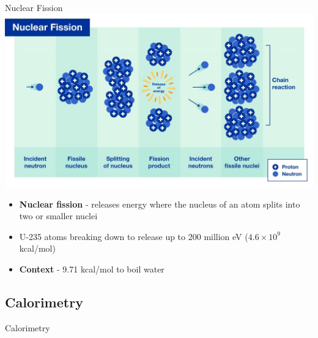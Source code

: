 \documentclass[11pt]{beamer}
\begin{document}
\begin{frame}{Nuclear Fission}
  \centering
  \includegraphics[width=0.8\linewidth]{nuclear_fission}

  \begin{itemize}
  \item \textbf{Nuclear fission} - releases energy where the
    nucleus of an atom splits into two or smaller nuclei
  \item U-235 atoms breaking down to release up to 200 million
    eV ($4.6\times 10^9$ kcal/mol)
  \item \textbf{Context} - 9.71 kcal/mol to boil water
  \end{itemize}
\end{frame}

\subsection{Calorimetry}

\begin{frame}{Calorimetry}
\end{frame}
\end{document}
